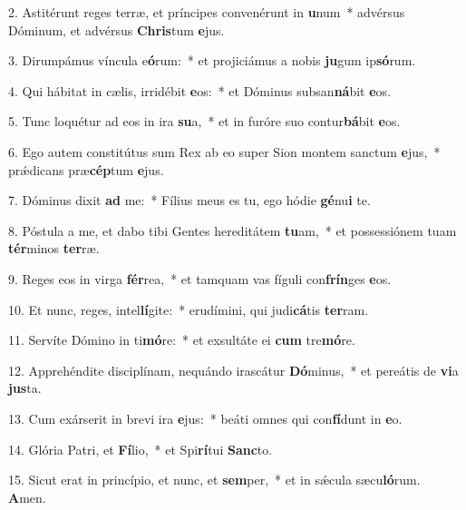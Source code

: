 2. Astitérunt reges terræ, et príncipes convenérunt in \textbf{u}num~*  advérsus Dóminum, et advérsus \textbf{Chris}tum \textbf{e}jus.\

3. Dirumpámus víncula e\textbf{ó}rum:~*  et projiciámus a nobis \textbf{ju}gum ip\textbf{só}rum.\

4. Qui hábitat in cælis, irridébit \textbf{e}os:~*  et Dóminus subsan\textbf{ná}bit \textbf{e}os.\

5. Tunc loquétur ad eos in ira \textbf{su}a,~*  et in furóre suo contur\textbf{bá}bit \textbf{e}os.\

6. Ego autem constitútus sum Rex ab eo super Sion montem sanctum \textbf{e}jus,~*  prǽdicans præ\textbf{cép}tum \textbf{e}jus.\

7. Dóminus dixit \textbf{ad} me:~*  Fílius meus es tu, ego hódie \textbf{gé}nu\textbf{i} te.\

8. Póstula a me, et dabo tibi Gentes hereditátem \textbf{tu}am,~*  et possessiónem tuam \textbf{tér}minos \textbf{ter}ræ.\

9. Reges eos in virga \textbf{fér}rea,~*  et tamquam vas fíguli con\textbf{frín}ges \textbf{e}os.\

10. Et nunc, reges, intel\textbf{lí}gite:~*  erudímini, qui judi\textbf{cá}tis \textbf{ter}ram.\

11. Servíte Dómino in ti\textbf{mó}re:~*  et exsultáte ei \textbf{cum} tre\textbf{mó}re.\

12. Apprehéndite disciplínam, nequándo irascátur \textbf{Dó}minus,~*  et pereátis de \textbf{vi}a \textbf{jus}ta.\

13. Cum exárserit in brevi ira \textbf{e}jus:~*  beáti omnes qui con\textbf{fí}dunt in \textbf{e}o.\

14. Glória Patri, et \textbf{Fí}lio,~*  et Spi\textbf{rí}tui \textbf{Sanc}to.\

15. Sicut erat in princípio, et nunc, et \textbf{sem}per,~*  et in sǽcula sæcu\textbf{ló}rum. \textbf{A}men.\

